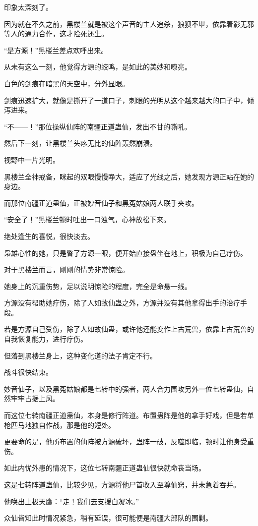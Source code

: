 \begin{this_body}
印象太深刻了。

因为就在不久之前，黑楼兰就是被这个声音的主人追杀，狼狈不堪，依靠着影无邪等人的通力合作，这才险死还生。

“是方源！”黑楼兰差点欢呼出来。

从未有这么一刻，他觉得方源的蛟鸣，是如此的美妙和嘹亮。

白色的剑痕在暗黑的天空中，分外显眼。

剑痕迅速扩大，就像是撕开了一道口子，刺眼的光明从这个越来越大的口子中，倾泻进来。

“不——！”那位操纵仙阵的南疆正道蛊仙，发出不甘的嘶吼。

然后下一刻，让黑楼兰头疼无比的仙阵轰然崩溃。

视野中一片光明。

黑楼兰全神戒备，眯起的双眼慢慢睁大，适应了光线之后，她发现方源正站在她的身边。

而那位南疆正道蛊仙，正被妙音仙子和黑菟姑娘两人联手夹攻。

“安全了！”黑楼兰顿时吐出一口浊气，心神放松下来。

绝处逢生的喜悦，很快淡去。

枭雄心性的她，只是瞥了方源一眼，便开始直接盘坐在地上，积极为自己疗伤。

对于黑楼兰而言，刚刚的情势非常惊险。

她身上的沉重伤势，足以说明惊险的程度，完全是命悬一线。

方源没有帮助她疗伤，除了人如故仙蛊之外，方源并没有其他拿得出手的治疗手段。

若是方源自己受伤，除了人如故仙蛊，或许他还能变作上古荒兽，依靠上古荒兽的自我恢复能力，进行疗伤。

但落到黑楼兰身上，这种变化道的法子肯定不行。

战斗很快结束。

妙音仙子，以及黑菟姑娘都是七转中的强者，两人合力围攻另外一位七转蛊仙，自然牢牢占据上风。

而这位七转南疆正道蛊仙，本身是修行阵道。布置蛊阵是他的拿手好戏，但是若单枪匹马地独自作战，那是他的短处。

更要命的是，他所布置的仙阵被方源破坏，蛊阵一破，反噬即临，顿时让他身受重伤。

如此内忧外患的情况下，这位七转南疆正道蛊仙很快就命丧当场。

这是七转阵道蛊仙，比较少见，方源将他尸首收入至尊仙窍，并未急着吞并。

他唤出上极天鹰：“走！我们去支援白凝冰。”

众仙皆知此时情况紧急，稍有延误，很可能便是南疆大部队的围剿。


\end{this_body}
